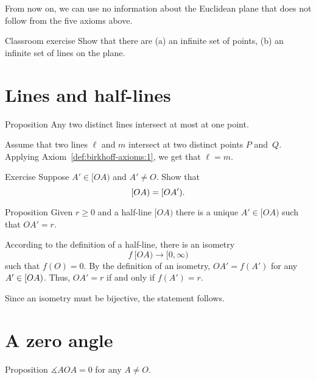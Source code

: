 From now on,  
we can use no information about the Euclidean plane that does not follow from the five axioms above.

\begin{thm}{Classroom exercise}\label{ex:infinite}
Show that there are (a) an infinite set of points,
(b) an infinite set of lines on the plane.
\end{thm}

\section{Lines and half-lines}

\begin{thm}[\abs]{Proposition}\label{lem:line-line}
\let\thefootnote\relax{}
Any two distinct lines intersect at most at one point.
\end{thm}

Assume that two lines $\ell$ and $m$ intersect at two distinct points $P$ and~$Q$.
Applying Axiom~\ref{def:birkhoff-axioms:1}, we get that $\ell=m$.
\qeds

\begin{thm}{Exercise}\label{ex:[OA)=[OA')}
Suppose $A'\in[OA)$ and $A'\not=O$. 
Show that 
\[[O A)=[O A').\]

\end{thm}

\begin{thm}[\abs]{Proposition}\label{prop:point-on-half-line}
Given $r\ge 0$ and a half-line $[O A)$ there is a unique $A'\in [O A)$  such that $O A'=r$.
\end{thm}

According to the definition of a half-line, 
there is an isometry 
$$f\:[O A)\to [0,\infty)$$
such that $f(O)=0$.
By the definition of an isometry, $O A'=f(A')$ for any $A'\in [O A)$.
Thus, $O A'=r$ if and only if $f(A')=r$.

Since an isometry must be bijective, the statement follows.
\qeds

\section{A zero angle}

\begin{thm}[\abs]{Proposition}\label{lem:AOA=0}
$\measuredangle A O A= 0$ for any $A\not=O$.
\end{thm}

